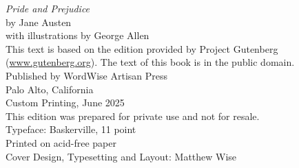 \newpage
\thispagestyle{empty} %
\vspace*{\fill}

\begin{center}
    \textit{Pride and Prejudice} \\
    by Jane Austen \\
    with illustrations by George Allen\\
    \vspace{1cm}
    This text is based on the edition provided by Project Gutenberg
    (\href{https://www.gutenberg.org}{www.gutenberg.org}). The text of this book is in the public domain. \\
    \vspace{1cm}
    Published by WordWise Artisan Press \\
    Palo Alto, California \\
    \vspace{1cm}
    Custom Printing, June 2025 \\
    \vspace{1cm}
    This edition was prepared for private use and not for resale. \\
    \vspace{0.5cm}
    Typeface: Baskerville, 11 point \\
    Printed on acid-free paper \\
    \vspace{1cm}
    Cover Design, Typesetting and Layout: Matthew Wise \\
\end{center}

\vspace{\fill}
